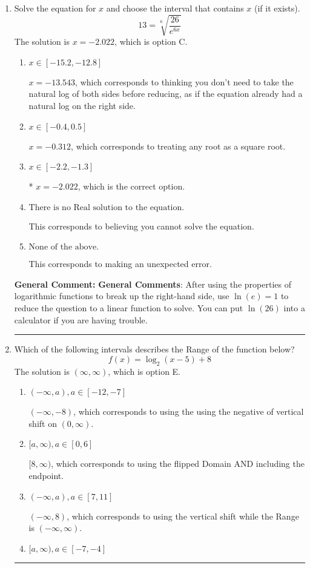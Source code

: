 \documentclass{extbook}[14pt]
\newcommand{\litem}[1]{\item #1

\rule{\textwidth}{0.4pt}}
\begin{document}
\begin{enumerate}\litem{
 Solve the equation for $x$ and choose the interval that contains $x$ (if it exists).
\[  13 = \sqrt[6]{\frac{26}{e^{6x}}} \]The solution is \( x = -2.022 \), which is option C.\begin{enumerate}[label=\Alph*.]
\item \( x \in [-15.2, -12.8] \)

$x = -13.543$, which corresponds to thinking you don't need to take the natural log of both sides before reducing, as if the equation already had a natural log on the right side.
\item \( x \in [-0.4, 0.5] \)

$x = -0.312$, which corresponds to treating any root as a square root.
\item \( x \in [-2.2, -1.3] \)

* $x = -2.022$, which is the correct option.
\item \( \text{There is no Real solution to the equation.} \)

This corresponds to believing you cannot solve the equation.
\item \( \text{None of the above.} \)

This corresponds to making an unexpected error.
\end{enumerate}

\textbf{General Comment:} \textbf{General Comments}: After using the properties of logarithmic functions to break up the right-hand side, use $\ln(e) = 1$ to reduce the question to a linear function to solve. You can put $\ln(26)$ into a calculator if you are having trouble.
}
\litem{
Which of the following intervals describes the Range of the function below?
\[ f(x) = \log_2{(x-5)}+8 \]The solution is \( (\infty, \infty) \), which is option E.\begin{enumerate}[label=\Alph*.]
\item \( (-\infty, a), a \in [-12, -7] \)

$(-\infty, -8)$, which corresponds to using the using the negative of vertical shift on $(0, \infty)$.
\item \( [a, \infty), a \in [0, 6] \)

$[8, \infty)$, which corresponds to using the flipped Domain AND including the endpoint.
\item \( (-\infty, a), a \in [7, 11] \)

$(-\infty, 8)$, which corresponds to using the vertical shift while the Range is $(-\infty, \infty)$.
\item \( [a, \infty), a \in [-7, -4] \)


\end{enumerate}}
\end{enumerate}
\end{document}
